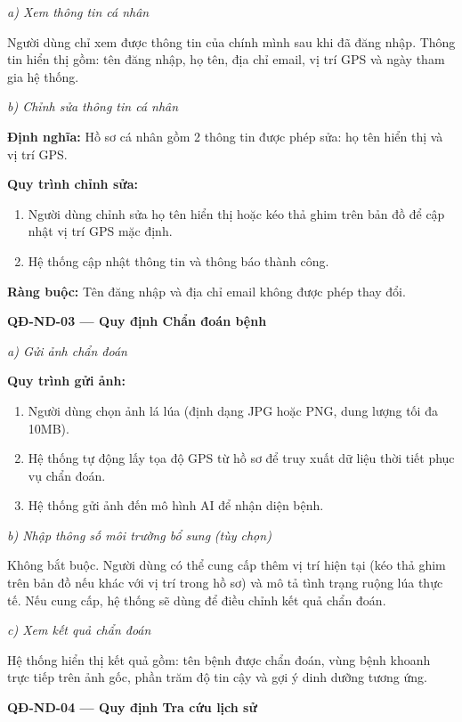 \documentclass[12pt,a4paper]{article}
\begin{document}
\noindent\textit{a) Xem thông tin cá nhân}

Người dùng chỉ xem được thông tin của chính mình sau khi đã đăng nhập. Thông tin hiển thị gồm: tên đăng nhập, họ tên, địa chỉ email, vị trí GPS và ngày tham gia hệ thống.

\noindent\textit{b) Chỉnh sửa thông tin cá nhân}

\noindent\textbf{Định nghĩa:} Hồ sơ cá nhân gồm 2 thông tin được phép sửa: họ tên hiển thị và vị trí GPS.

\noindent\textbf{Quy trình chỉnh sửa:}
\begin{enumerate}
    \item Người dùng chỉnh sửa họ tên hiển thị hoặc kéo thả ghim trên bản đồ để cập nhật vị trí GPS mặc định.
    \item Hệ thống cập nhật thông tin và thông báo thành công.
\end{enumerate}
\noindent\textbf{Ràng buộc:} Tên đăng nhập và địa chỉ email không được phép thay đổi.

\vspace{0.3cm}
\noindent\textbf{QĐ-ND-03 --- Quy định Chẩn đoán bệnh}

\noindent\textit{a) Gửi ảnh chẩn đoán}

\noindent\textbf{Quy trình gửi ảnh:}
\begin{enumerate}
    \item Người dùng chọn ảnh lá lúa (định dạng JPG hoặc PNG, dung lượng tối đa 10MB).
    \item Hệ thống tự động lấy tọa độ GPS từ hồ sơ để truy xuất dữ liệu thời tiết phục vụ chẩn đoán.
    \item Hệ thống gửi ảnh đến mô hình AI để nhận diện bệnh.
\end{enumerate}

\noindent\textit{b) Nhập thông số môi trường bổ sung} \textit{(tùy chọn)}

Không bắt buộc. Người dùng có thể cung cấp thêm vị trí hiện tại (kéo thả ghim trên bản đồ nếu khác với vị trí trong hồ sơ) và mô tả tình trạng ruộng lúa thực tế. Nếu cung cấp, hệ thống sẽ dùng để điều chỉnh kết quả chẩn đoán.

\noindent\textit{c) Xem kết quả chẩn đoán}

Hệ thống hiển thị kết quả gồm: tên bệnh được chẩn đoán, vùng bệnh khoanh trực tiếp trên ảnh gốc, phần trăm độ tin cậy và gợi ý dinh dưỡng tương ứng.

\vspace{0.3cm}
\noindent\textbf{QĐ-ND-04 --- Quy định Tra cứu lịch sử}
\end{document}
